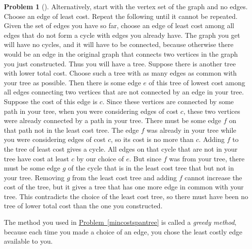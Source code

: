 \documentclass[10pt,]{book}
\theoremstyle{plain}
\theoremstyle{definition}
\newtheorem{activity}[project]{Problem}
\theoremstyle{definition}
\numberwithin{equation}{chapter}
\begin{document}
\begin{activity}[]
Alternatively, start with the vertex set of the graph and no edges. Choose an edge of least cost. Repeat the following until it cannot be repeated. Given the set of edges you have so far, choose an edge of least cost among all edges that do not form a cycle with edges you already have. The graph you get will have no cycles, and it will have to be connected, because otherwise there would be an edge in the original graph that connects two vertices in the graph you just constructed. Thus you will have a tree. Suppose there is another tree with lower total cost. Choose such a tree with as many edges as common with your tree as possible. Then there is some edge \(e\) of this tree of lowest cost among all edges connecting two vertices that are not connected by an edge in your tree. Suppose the cost of this edge is \(c\). Since these vertices are connected by some path in your tree, when you were considering edges of cost \(c\), these two vertices were already connected by a path in your tree. There must be some edge \(f\) on that path not in the least cost tree. The edge \(f\) was already in your tree while you were considering edges of cost \(c\), so its cost is no more than \(c\). Adding \(f\) to the tree of least cost gives a cycle. All edges on that cycle that are not in your tree have cost at least \(c\) by our choice of \(e\). But since \(f\) was from your tree, there must be some edge \(g\) of the cycle that is in the least cost tree that but not in your tree. Removing \(g\) from the least cost tree and adding \(f\) cannot increase the cost of the tree, but it gives a tree that has one more edge in common with your tree. This contradicts the choice of the least cost tree, so there must have been no tree of lower total cost than the one you constructed.%
\end{activity}
The method you used in \hyperref[mincostspantree]{Problem~\ref{mincostspantree}} is called a \emph{greedy method}, because each time you made a choice of an edge, you chose the least costly edge available to you.%
\typeout{************************************************}
\typeout{************************************************}
\end{document}
